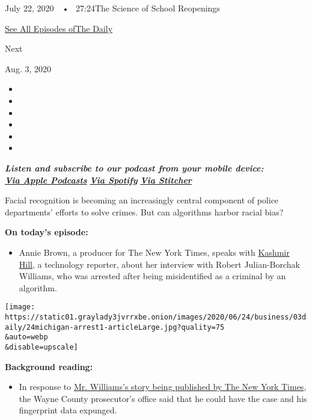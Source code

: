 July 22, 2020~~•~ 27:24The Science of School Reopenings

\href{https://www.nytimes3xbfgragh.onion/column/the-daily}{See All
Episodes ofThe Daily}

Next

Aug. 3, 2020

\begin{itemize}
\item
\item
\item
\item
\item
\item
\end{itemize}

\emph{\textbf{Listen and subscribe to our podcast from your mobile
device:}}\\
\textbf{\href{https://itunes.apple.com/us/podcast/the-daily/id1200361736?mt=2}{\emph{Via
Apple Podcasts}}} \emph{\textbf{\textbar{}}}
\textbf{\href{https://open.spotify.com/show/3IM0lmZxpFAY7CwMuv9H4g?si=SfuMSC55R1qprFsRZU3_zw}{\emph{Via
Spotify}}} \emph{\textbf{\textbar{}}}
\textbf{\href{http://www.stitcher.com/podcast/the-new-york-times/the-daily-10}{\emph{Via
Stitcher}}}

Facial recognition is becoming an increasingly central component of
police departments' efforts to solve crimes. But can algorithms harbor
racial bias?

\textbf{On today's episode:}

\begin{itemize}
\tightlist
\item
  Annie Brown, a producer for The New York Times, speaks with
  \href{https://www.nytimes3xbfgragh.onion/by/kashmir-hill}{Kashmir
  Hill}, a technology reporter, about her interview with Robert
  Julian-Borchak Williams, who was arrested after being misidentified as
  a criminal by an algorithm.
\end{itemize}

\texttt{[image: https://static01.graylady3jvrrxbe.onion/images/2020/06/24/business/03daily/24michigan-arrest1-articleLarge.jpg?quality=75\\\&auto=webp\\\&disable=upscale]}

\textbf{Background reading:}

\begin{itemize}
\tightlist
\item
  In response to
  \href{https://www.nytimes3xbfgragh.onion/2020/06/24/technology/facial-recognition-arrest.html}{Mr.
  Williams's story being published by The New York Times}, the Wayne
  County prosecutor's office said that he could have the case and his
  fingerprint data expunged.
\end{itemize}

